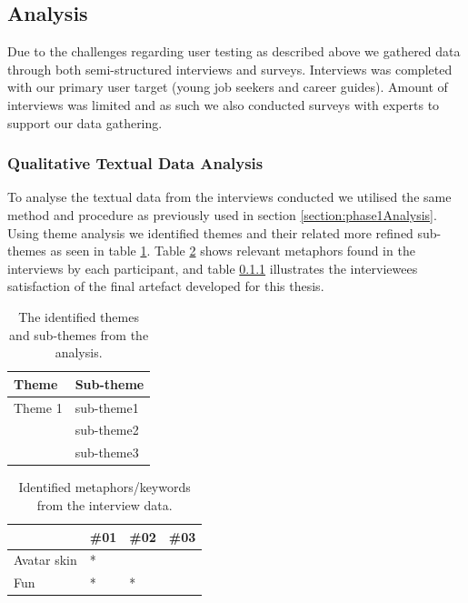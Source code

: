 


\subsection{Analysis}
Due to the challenges regarding user testing as described above we gathered data through both semi-structured interviews and surveys. Interviews was completed with our primary user target (young job seekers and career guides). Amount of interviews was limited and as such we also conducted surveys with experts to support our data gathering.      


\subsubsection{Qualitative Textual Data Analysis}
To analyse the textual data from the interviews conducted we utilised the same method and procedure as previously used in section \ref{section:phase1Analysis}. Using theme analysis we identified themes and their related more refined sub-themes as seen in table \ref{table:phase3ThemeAnalysis}. Table \ref{table:phase3MethaphorsAnalysis} shows relevant metaphors found in the interviews by each participant, and table \ref{} illustrates the interviewees satisfaction of the final artefact developed for this thesis.

\begin{table}[]
      \centering
        \begin{tabular}{ll}
        \toprule
        Theme & Sub-theme \\
        \midrule
       Theme 1 & sub-theme1\\
        & sub-theme2 \\\vspace{0.2cm}
        & sub-theme3 \\
       
        \bottomrule
        \end{tabular}
        \caption{The identified themes and sub-themes from the analysis.}
        \label{table:phase3ThemeAnalysis}
\end{table}






\begin{table}[]
\centering
\begin{tabular}{l|lll}
                            & \#01 &\#02 &\#03 \\ \hline 
Avatar skin                 & *        &          &         \\ 
Fun                         & *        & *        &          \\ 

\end{tabular}
\caption{Identified metaphors/keywords from the interview data.}
\label{table:phase3MethaphorsAnalysis}
\end{table}


